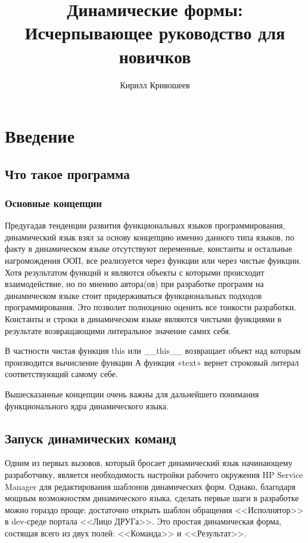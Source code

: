 \documentclass[10pt]{book}
\begin{document}
	\title{Динамические формы: Исчерпывающее руководство для новичков}
	\author{Кирилл Кривошеев}

	\maketitle
	\tableofcontents
	\mainmatter
	
	\chapter{Введение}
	
	\section{Что такое программа}
	
    \subsection{Основные концепции}
        Предугадав тенденции развития функциональных языков программирования, динамический язык взял за основу концепцию именно данного типа языков, по факту в динамическом языке отсутствуют переменные, константы и остальные нагромождения ООП, все реализуется через функции или через чистые функции. Хотя результатом функций и являются объекты с которыми происходит взаимодействие, но по мнению автора(ов) при разработке программ на динамическом языке стоит придерживаться функциональных подходов программирования. Это позволит полноценно оценить все тонкости разработки.
        Константы и строки в динамическом языке являются чистыми функциями в результате возвращающими литеральное значение самих себя.
        
        В частности чистая функция this или __this__  возвращает объект над которым производится вычисление функции
        А функция «text» вернет строковый литерал соответствующий самому себе.
        
        Вышесказанные концепции очень важны для дальнейшего понимания функционального ядра динамического языка.

	\section{Запуск динамических команд}
	Одним из первых вызовов, который бросает динамический язык начинающему разработчику, является необходимость настройки рабочего окружения HP Service Manager для редактирования шаблонов динамических форм. Однако, благодаря мощным возможностям динамического языка, сделать первые шаги в разработке можно гораздо проще: достаточно открыть шаблон обращения <<Исполнятор>> в dev-среде портала <<Лицо ДРУГа>>. Это простая динамическая форма, состящая всего из двух полей: <<Команда>> и <<Результат>>.
	
\end{document}

